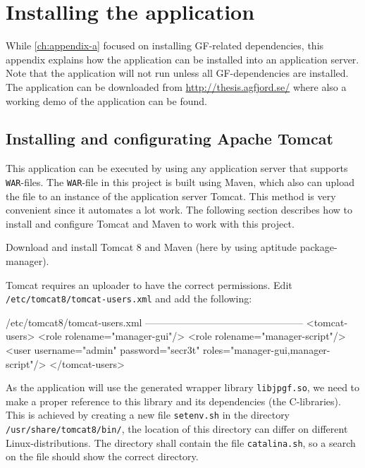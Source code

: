 \chapter{Installing the application}\label{ch:appendix-b}

While \autoref{ch:appendix-a} focused on installing GF-related dependencies, this appendix explains how the application can be installed into an application server. Note that the application will not run unless all GF-dependencies are installed. The application can be downloaded from \url{http://thesis.agfjord.se/} where also a working demo of the application can be found.

\section{Installing and configurating Apache Tomcat}
This application can be executed by using any application server that supports \texttt{WAR}-files. The \texttt{WAR}-file in this project is built using Maven, which also can upload the file to an instance of the application server Tomcat. This method is very convenient since it automates a lot work. The following section describes how to install and configure Tomcat and Maven to work with this project.

Download and install Tomcat 8 and Maven (here by using aptitude package-manager).


Tomcat requires an uploader to have the correct permissions.
\newline
Edit \texttt{/etc/tomcat8/tomcat-users.xml} and add the following:

\begin{terminal}
/etc/tomcat8/tomcat-users.xml
------------------------------------------------
<tomcat-users>
  <role rolename="manager-gui"/>
  <role rolename="manager-script"/>
  <user username="admin" password="secr3t" roles="manager-gui,manager-script"/>
</tomcat-users>
\end{terminal}

As the application will use the generated wrapper library \texttt{libjpgf.so}, we need to make a proper reference to this library and its dependencies (the C-libraries). This is achieved by creating a new file \texttt{setenv.sh} in the directory \texttt{/usr/share/tomcat8/bin/}, the location of this directory can differ on different Linux-distributions. The directory shall contain the file \texttt{catalina.sh}, so a search on the file should show the correct directory.

